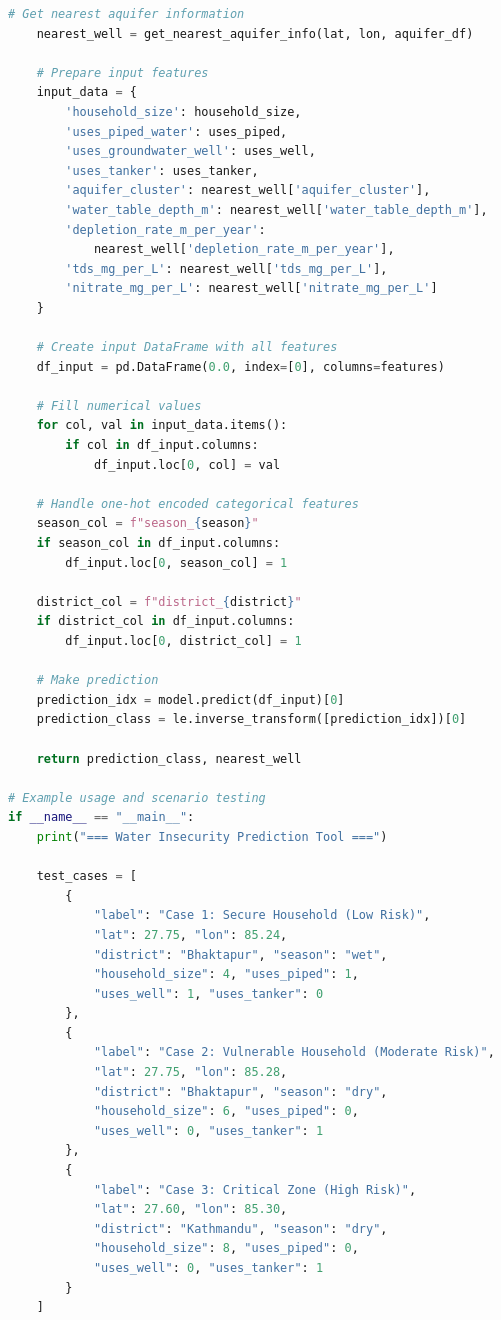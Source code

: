 \documentclass[conference]{IEEEtran}
\begin{document}
\begin{lstlisting}[language=Python, caption=Water Insecurity Prediction Function]
    # Get nearest aquifer information
    nearest_well = get_nearest_aquifer_info(lat, lon, aquifer_df)
    
    # Prepare input features
    input_data = {
        'household_size': household_size,
        'uses_piped_water': uses_piped,
        'uses_groundwater_well': uses_well,
        'uses_tanker': uses_tanker,
        'aquifer_cluster': nearest_well['aquifer_cluster'],
        'water_table_depth_m': nearest_well['water_table_depth_m'],
        'depletion_rate_m_per_year': 
            nearest_well['depletion_rate_m_per_year'],
        'tds_mg_per_L': nearest_well['tds_mg_per_L'],
        'nitrate_mg_per_L': nearest_well['nitrate_mg_per_L']
    }
    
    # Create input DataFrame with all features
    df_input = pd.DataFrame(0.0, index=[0], columns=features)
    
    # Fill numerical values
    for col, val in input_data.items():
        if col in df_input.columns:
            df_input.loc[0, col] = val
    
    # Handle one-hot encoded categorical features
    season_col = f"season_{season}"
    if season_col in df_input.columns:
        df_input.loc[0, season_col] = 1
        
    district_col = f"district_{district}"
    if district_col in df_input.columns:
        df_input.loc[0, district_col] = 1
    
    # Make prediction
    prediction_idx = model.predict(df_input)[0]
    prediction_class = le.inverse_transform([prediction_idx])[0]
    
    return prediction_class, nearest_well

# Example usage and scenario testing
if __name__ == "__main__":
    print("=== Water Insecurity Prediction Tool ===")
    
    test_cases = [
        {
            "label": "Case 1: Secure Household (Low Risk)",
            "lat": 27.75, "lon": 85.24, 
            "district": "Bhaktapur", "season": "wet",
            "household_size": 4, "uses_piped": 1, 
            "uses_well": 1, "uses_tanker": 0
        },
        {
            "label": "Case 2: Vulnerable Household (Moderate Risk)",
            "lat": 27.75, "lon": 85.28, 
            "district": "Bhaktapur", "season": "dry",
            "household_size": 6, "uses_piped": 0, 
            "uses_well": 0, "uses_tanker": 1
        },
        {
            "label": "Case 3: Critical Zone (High Risk)",
            "lat": 27.60, "lon": 85.30, 
            "district": "Kathmandu", "season": "dry",
            "household_size": 8, "uses_piped": 0, 
            "uses_well": 0, "uses_tanker": 1
        }
    ]
    

\end{lstlisting}
\end{document}
